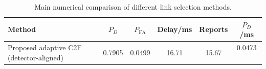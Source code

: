 \begin{table}[t]
    \centering
    \caption{Main numerical comparison of different link selection methods.}
    \label{tab:main_summary}
    \begin{tabular}{l c c c c c}
        \hline
        Method & $P_D$ & $P_{\mathrm{FA}}$ & Delay/ms & Reports & $P_D$/ms \\
        \hline
        Proposed adaptive C2F (detector-aligned) & 0.7905 & 0.0499 & 16.71 & 15.67 & 0.0473 \
        \hline
    \end{tabular}
\end{table}
